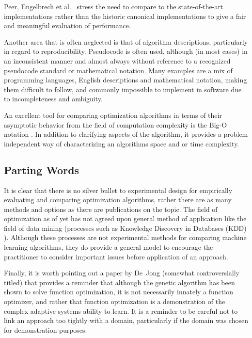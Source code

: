 Peer, Engelbrech et al.\ \cite{Peer2003} stress the need to compare to the state-of-the-art implementations rather than the historic canonical implementations to give a fair and meaningful evaluation of performance.

Another area that is often neglected is that of algorithm descriptions, particularly in regard to reproducibility. Pseudocode is often used, although (in most cases) in an inconsistent manner and almost always without reference to a recognized pseudocode standard or mathematical notation. Many examples are a mix of programming languages, English descriptions and mathematical notation, making them difficult to follow, and commonly impossible to implement in software due to incompleteness and ambiguity.

An excellent tool for comparing optimization algorithms in terms of their asymptotic behavior from the field of computation complexity is the Big-O notation \cite{Cormen2001}. In addition to clarifying aspects of the algorithm, it provides a problem independent way of characterizing an algorithms space and or time complexity.


% 
% 
\subsection{Parting Words}
It is clear that there is no silver bullet to experimental design for empirically evaluating and comparing optimization algorithms, rather there are as many methods and options as there are publications on the topic. The field of optimization as of yet has not agreed upon general method of application like the field of data mining (processes such as Knowledge Discovery in Databases (KDD) \cite{Fayyad1996}). Although these processes are not experimental methods for comparing machine learning algorithms, they do provide a general model to encourage the practitioner to consider important issues before application of an approach.

Finally, it is worth pointing out a paper by De~Jong \cite{Jong1992} (somewhat controversially titled) that provides a reminder that although the genetic algorithm has been shown to solve function optimization, it is not necessarily innately a function optimizer, and rather that function optimization is a demonstration of the complex adaptive systems ability to learn. It is a reminder to be careful not to link an approach too tightly with a domain, particularly if the domain was chosen for demonstration purposes.
